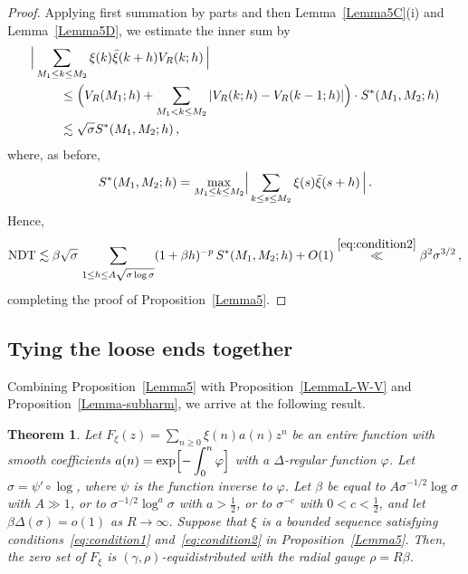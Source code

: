 \documentclass[11pt]{amsart}
\numberwithin{equation}{section}
\newtheorem{theorem}{Theorem}
\begin{document}
\begin{proof}
Applying first summation by parts and then Lemma~\ref{Lemma5C}(i) and Lemma~\ref{Lemma5D},
we estimate the inner sum by
\begin{align*}
\Bigl|& \sum_{M_1\le k \le M_2} \xi(k)\bar\xi(k+h) V_R(k; h) \,\Bigr| \\
& \qquad \le \Bigl( V_R(M_1; h) + \sum_{M_1<k\le M_2} |V_R(k; h)-V_R(k-1; h)|\Bigr)
\cdot S^*(M_1, M_2; h) \\
& \qquad \lesssim \sqrt{\sigma} S^*(M_1, M_2; h)\,,
\end{align*}
where, as before,
\[
S^*(M_1, M_2; h) = \max_{M_1\le k \le M_2}
\Bigl|\,
\sum_{k\le s \le M_2} \xi(s)\bar\xi(s+h)
\,\Bigr|\,.
\]
Hence,
\[
{\rm NDT} \lesssim
\beta\sqrt{\sigma}\,
\sum_{1 \le h \le A\sqrt{\sigma\log\sigma}} (1+\beta h)^{-p}\,
S^*(M_1, M_2; h) + O(1) \stackrel{\eqref{eq:condition2}}\ll \beta^2\sigma^{3/2}\,,
\]
completing the proof of Proposition~\ref{Lemma5}.
\end{proof}

\subsection{Tying the loose ends together}

Combining Proposition~\ref{Lemma5} with Pro\-position~\ref{LemmaL-W-V} and Proposition~\ref{Lemma-subharm},
we arrive at the following result.

\begin{theorem}\label{thm:main1}
Let $F_\xi (z) = \sum_{n\ge 0} \xi(n) a(n) z^n $ be an entire function with smooth
coefficients $a(n) = \exp\Bigl[ -\displaystyle \int_0^n \varphi \Bigr]$ with a $\Delta$-regular
function $\varphi$. Let $\sigma = \psi'\circ\log$,
where $\psi$ is the function inverse to $\varphi$. Let $\beta$
be equal to $A\sigma^{-1/2}\log\sigma$ with $A\gg 1$, or to $\sigma^{-1/2}\log^a\sigma$
with $a>\tfrac12$,
or to $\sigma^{-c}$ with $0<c<\tfrac12$, and let $\beta \Delta(\sigma) = o(1)$ as $R\to\infty$.
Suppose that $\xi$ is a bounded sequence satisfying
conditions~\eqref{eq:condition1} and~\eqref{eq:condition2} in Proposition~\ref{Lemma5}.
Then, the zero set of $F_\xi$ is $(\gamma, \rho)$-equidistributed with the radial gauge $\rho=R\beta$.
\end{theorem}
\end{document}
